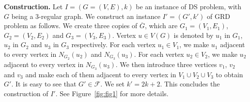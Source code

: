 \documentclass[preprint,12pt]{elsarticle}
\begin{document}
\medskip
\noindent \textbf{Construction.} Let $I = (G = (V, E), k)$ be an instance of DS problem, with $G$ being a $3$-regular graph. We construct an instance $I' = (G', k')$ of GRD problem as follows. We create three copies of $\overline{G}$, which are $G_1 = (V_1, E_1)$, $G_2 = (V_2, E_2)$ and $G_3 = (V_3, E_3)$. Vertex $u \in V(G)$ is denoted by $u_1$ in $G_1$, $u_2$ in $G_2$ and $u_3$ in $G_3$ respectively. For each vertex $u_1 \in V_1$, we make $u_1$ adjacent to every vertex in $N_{G_2}(u_2)$ and $N_{G_3}(u_3)$. For each vertex $u_2 \in V_2$, we make $u_2$ adjacent to every vertex in $N_{G_3}(u_3)$. We then introduce three vertices $v_1$, $v_2$ and $v_3$ and make each of them adjacent to every vertex in $V_1 \cup V_2 \cup V_3$ to obtain $G'$. It is easy to see that $G' \in \mathcal{F}$. We set $k' = 2k+2$. This concludes the construction of $I'$. See Figure~\ref{fig:fig1} for more details.
\end{document}

